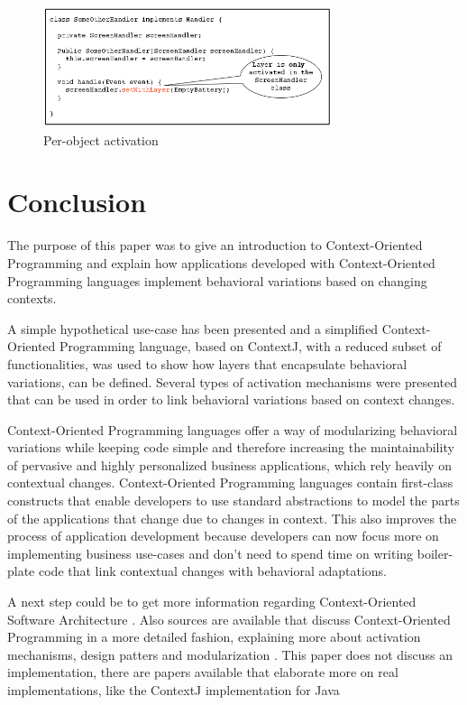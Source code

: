 \documentclass{acm_proc_article-sp}
\begin{document}
\begin{figure}[H]
\centering
\includegraphics[width=85mm]{per_object_activation_toy.png}
\caption{Per-object activation}
\label{fig:per_object_activation}
\end{figure}

\section{Conclusion}
\label{sec:conclusion}
The purpose of this paper was to give an introduction to Context-Oriented Programming and explain how applications developed with Context-Oriented Programming languages implement behavioral variations based on changing contexts. 

A simple hypothetical use-case has been presented and a simplified Context-Oriented Programming language, based on ContextJ, with a reduced subset of functionalities, was used to show how layers that encapsulate behavioral variations, can be defined. Several types of activation mechanisms were presented that can be used in order to link behavioral variations based on context changes.

Context-Oriented Programming languages offer a way of modularizing behavioral variations while keeping code simple and therefore increasing the maintainability of pervasive and highly personalized business applications, which rely heavily on contextual changes. Context-Oriented Programming languages contain first-class constructs that enable developers to use standard abstractions to model the parts of the applications that change due to changes in context. This also improves the process of application development because developers can now focus more on implementing business use-cases and don't need to spend time on writing boiler-plate code that link contextual changes with behavioral adaptations.

A next step could be to get more information regarding Context-Oriented Software Architecture \cite{Mens:2016:CSA:2951965.2951971}. Also sources are available that discuss Context-Oriented Programming in a more detailed fashion, explaining more about activation mechanisms, design patters and modularization \cite{SALVANESCHI20121801}. This paper does not discuss an implementation, there are papers available that elaborate more on real implementations, like the ContextJ implementation for Java \cite{Appeltauer:2009:IDC:1562112.1562117}



\end{document}
